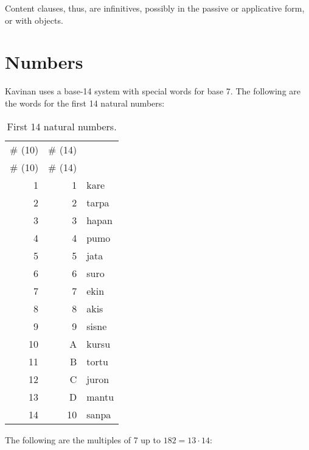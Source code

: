 \documentclass{book}
\begin{document}
Content clauses, thus, are infinitives, possibly in the passive or applicative form, or with objects.

\chapter{Numbers}

Kavinan uses a base-14 system with special words for base 7. The following are the words for the first 14 natural numbers:

\begin{longtabu}[c]{|r|r|X|}
    \caption{First 14 natural numbers.}
    \centering
    
    \\ \hline
    \# (10) & \# (14) & \\
    \hline
    \endfirsthead
    
    \hline
    \# (10) & \# (14) & \\
    \hline
    \endhead
    
    \hline
    \endfoot
    
    \hline
    \endlastfoot
    
    1 & 1 & kare \\
    2 & 2 & tarpa \\
    3 & 3 & hapan \\
    4 & 4 & pumo \\
    5 & 5 & jata \\
    6 & 6 & suro \\
    7 & 7 & ekin \\
    8 & 8 & akis \\
    9 & 9 & sisne \\
    10 & A & kursu \\
    11 & B & tortu \\
    12 & C & juron \\
    13 & D & mantu \\
    14 & 10 & sanpa \\
\end{longtabu}

The following are the multiples of 7 up to $182 = 13 \cdot 14$:
\end{document}
